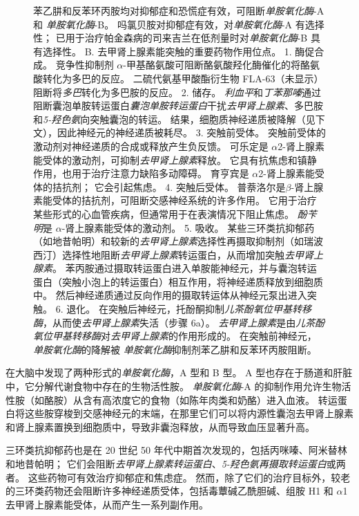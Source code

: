 \begin{figure}[htbp]
{	苯乙肼和反苯环丙胺均对抑郁症和恐慌症有效，可阻断\textit{单胺氧化酶}-A 和 \textit{单胺氧化酶}-B。
	吗氯贝胺对抑郁症有效，对\textit{单胺氧化酶}-A 有选择性；
	已用于治疗帕金森病的司来吉兰在低剂量时对\textit{单胺氧化酶}-B 具有选择性。 
	B. 去甲肾上腺素能突触的重要药物作用位点。 
	1. 酶促合成。
	竞争性抑制剂 $\alpha$-甲基酪氨酸可阻断酪氨酸羟化酶催化的将酪氨酸转化为多巴的反应。
	二硫代氨基甲酸酯衍生物 FLA-63（未显示）阻断将\textit{多巴}转化为多巴胺的反应。
	2. 储存。
	\textit{利血平}和\textit{丁苯那嗪}通过阻断囊泡单胺转运蛋白\textit{囊泡单胺转运蛋白}干扰\textit{去甲肾上腺素}、多巴胺和\textit{5-羟色氨}向突触囊泡的转运。
	结果，细胞质神经递质被降解（见下文），因此神经元的神经递质被耗尽。
	3. 突触前受体。
	突触前受体的激动剂对神经递质的合成或释放产生负反馈。
	可乐定是 $\alpha$2-肾上腺素能受体的激动剂，可抑制\textit{去甲肾上腺素}释放。
	它具有抗焦虑和镇静作用，也用于治疗注意力缺陷多动障碍。
	育亨宾是 $\alpha$2-肾上腺素能受体的拮抗剂； 它会引起焦虑。
	4. 突触后受体。
	普萘洛尔是$\beta$-肾上腺素能受体的拮抗剂，可阻断交感神经系统的许多作用。
	它用于治疗某些形式的心血管疾病，但通常用于在表演情况下阻止焦虑。
	\textit{酚苄明}是 $\alpha$-肾上腺素能受体的激动剂。
	5. 吸收。
	某些三环类抗抑郁药（如地昔帕明）和较新的\textit{去甲肾上腺素}选择性再摄取抑制剂（如瑞波西汀）选择性地阻断\textit{去甲肾上腺素}转运蛋白，从而增加突触\textit{去甲肾上腺素}。
	苯丙胺通过摄取转运蛋白进入单胺能神经元，并与囊泡转运蛋白（突触小泡上的转运蛋白）相互作用，将神经递质释放到细胞质中。
	然后神经递质通过反向作用的摄取转运体从神经元泵出进入突触。
	6. 退化。
	在突触后神经元，托酚酮抑制\textit{儿茶酚氧位甲基转移酶}，从而使\textit{去甲肾上腺素}失活（步骤 6a）。
	\textit{去甲肾上腺素}是由\textit{儿茶酚氧位甲基转移酶}对\textit{去甲肾上腺素}的作用形成的。
	在突触前神经元，\textit{单胺氧化酶}的降解被 \textit{单胺氧化酶}抑制剂苯乙肼和反苯环丙胺阻断。}
\end{figure}


在大脑中发现了两种形式的\textit{单胺氧化酶}，A 型和 B 型。
A 型也存在于肠道和肝脏中，它分解代谢食物中存在的生物活性胺。
\textit{单胺氧化酶}-A 的抑制作用允许生物活性胺（如酪胺）从含有高浓度它的食物（如陈年肉类和奶酪）进入血液。
转运蛋白将这些胺穿梭到交感神经元的末端，在那里它们可以将内源性囊泡去甲肾上腺素和肾上腺素置换到细胞质中，导致非囊泡释放，从而导致血压显著升高。


三环类抗抑郁药也是在 20 世纪 50 年代中期首次发现的，包括丙咪嗪、阿米替林和地昔帕明；
它们会阻断\textit{去甲肾上腺素转运蛋白}、\textit{5-羟色氨再摄取转运蛋白}或两者。
这些药物可有效治疗抑郁症和焦虑症。
然而，除了它们的治疗目标外，较老的三环类药物还会阻断许多神经递质受体，包括毒蕈碱乙酰胆碱、组胺 H1 和 $\alpha$1 去甲肾上腺素能受体，从而产生一系列副作用。


